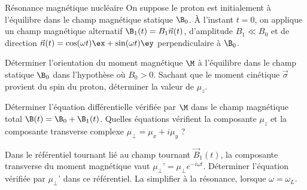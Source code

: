\begin{exo}[PC][1][TD]{Résonance magnétique nucléaire}
 On suppose le proton est initialement à l'équilibre dans le champ magnétique statique $\B_0$. À l’instant $t=0$, on applique un champ magnétique alternatif $\B_1(t) = B_1 \Vec{n}(t)$, d’amplitude $B_1 \ll B_0$ et de direction $\Vec{n}(t) = \cos(\omega t) \ex + \sin(\omega t) \ey$ perpendiculaire à $\B_0$. 
\begin{quest}
	\item Déterminer l’orientation
	du moment magnétique $\M$ à l’équilibre dans le champ statique $\B_0$ dans l’hypothèse où $B_0 >0$. Sachant que le moment cinétique $\Vec{\sigma}$ provient du spin du proton, déterminer la valeur de $\mu_z$.
	\item Déterminer l’équation différentielle vérifiée par $\M$ dans le champ magnétique total $\B(t) = \B_0 + \B_1(t)$. Quelles équations vérifient la composante $\mu_z$ et la composante transverse complexe $\mu_\perp = \mu_x + i\mu_y$ ?
\item Dans le référentiel tournant lié au champ tournant $\Vec{B}_1(t)$, la composante transverse du moment magnétique vaut $\mu_\perp’ =  \mu_\perp e^{-i\omega t}$. Déterminer l’équation vérifiée par $\mu_\perp’$ dans ce référentiel. La simplifier à la résonance, lorsque $\omega = \omega_L$.
\end{quest}
\end{exo}
